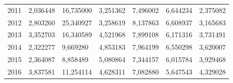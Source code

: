 \begin{table}
\begin{tabular}{p{1cm}p{2cm}p{2cm}p{2cm}p{2cm}p{2cm}p{2cm}}
 2011 &         2,036448 &                           16,735000 &                    3,251362 &                   7,496002 &                        6,644234 & 2,375082 \\
 2012 &         2,803260 &                           25,340927 &                    3,258619 &                   8,137863 &                        6,608937 & 3,165683 \\
 2013 &         3,352703 &                           16,340589 &                    4,521968 &                   7,899108 &                        6,171316 & 3,731491 \\
 2014 &         2,322277 &                            9,669280 &                    4,853183 &                   7,964199 &                        6,550298 & 3,620007 \\
 2015 &         2,364087 &                            8,858489 &                    5,080864 &                   7,344157 &                        6,015784 & 3,929468 \\
 2016 &         3,837581 &                           11,254114 &                    4,628311 &                   7,082880 &                        5,647543 & 4,329028 \\
\bottomrule
\end{tabular}
\end{table}
